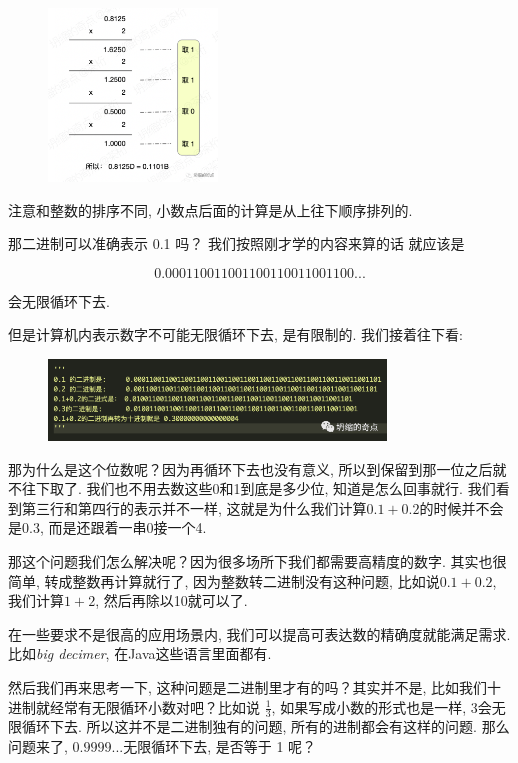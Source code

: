 \begin{figure}[ht]
  \centering
  \includegraphics[width=0.4\textwidth]{asset/20231227140841.png}
  \caption{}
  \label{fig:img2_16}
\end{figure}

注意和整数的排序不同, 小数点后面的计算是从上往下顺序排列的. 

那二进制可以准确表示 0.1 吗？ 我们按照刚才学的内容来算的话 就应该是 

\[0.000110011001100110011001100 ... \]

会无限循环下去. 

但是计算机内表示数字不可能无限循环下去, 是有限制的. 我们接着往下看:

\begin{figure}[ht]
  \centering\includegraphics[width=0.8\textwidth]{asset/20231227140947.png}
  \caption{}
  \label{fig:img2_17}
\end{figure}

那为什么是这个位数呢？因为再循环下去也没有意义, 所以到保留到那一位之后就不往下取了. 我们也不用去数这些0和1到底是多少位, 知道是怎么回事就行. 我们看到第三行和第四行的表示并不一样, 这就是为什么我们计算$0.1+0.2$的时候并不会是$0.3$, 而是还跟着一串0接一个4. 

那这个问题我们怎么解决呢？因为很多场所下我们都需要高精度的数字. 其实也很简单, 转成整数再计算就行了, 因为整数转二进制没有这种问题, 比如说$0.1+0.2$, 我们计算$1+2$, 然后再除以10就可以了. 

在一些要求不是很高的应用场景内, 我们可以提高可表达数的精确度就能满足需求. 比如\textit{big decimer},  在Java这些语言里面都有. 

然后我们再来思考一下, 这种问题是二进制里才有的吗？其实并不是, 比如我们十进制就经常有无限循环小数对吧？比如说 $\frac{1}{3}$,  如果写成小数的形式也是一样, 3会无限循环下去. 所以这并不是二进制独有的问题, 所有的进制都会有这样的问题. 那么问题来了, $0.9999 ... $无限循环下去, 是否等于 1 呢？

